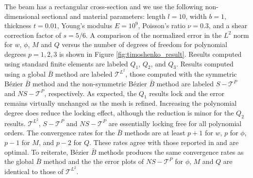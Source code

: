 The beam has a rectangular cross-section and we use the following non-dimensional sectional and material parameters: length $l=10$, width $b=1$, thickness $t=0.01$, Young's modulus $E=10^9$, Poisson's ratio $\nu=0.3$, and a shear correction factor of $s=5/6$. A comparison of the normalized error in the $L^2$ norm for $w$, $\phi$, $M$ and $Q$ versus the number of degrees of freedom for polynomial degrees $p=1,2,3$ is shown in Figure \ref{fig:timoshenko_result}. Results computed using standard finite elements are labeled $Q_1$, $Q_2$, and $Q_3$. Results computed using a global $\bar{B}$ method are labeled $\mathcal{T}^{L^2}$, those computed with the symmetric B\'ezier $\bar{B}$ method and the non-symmetric B\'ezier $\bar{B}$ method are labeled $S-\mathcal{T}^{P}$ and $NS-\mathcal{T}^{P}$, respectively. As expected, the $Q_1$ results lock and the error remains virtually unchanged as the mesh is refined. Increasing the polynomial degree does reduce the locking effect, although the reduction is minor for the $Q_2$ results. $\mathcal{T}^{L^2}$, $S-\mathcal{T}^{P}$ and $NS-\mathcal{T}^P$ are essentially locking free for all polynomial orders. The convergence rates for the $\bar{B}$ methods are at least $p+1$ for $w$, $p$ for $\phi$, $p-1$ for $M$, and $p-2$ for $Q$. These rates agree with those reported in \cite{kiendl_single-variable_2015} and are optimal. To reiterate, B\'{e}zier $\bar{B}$ methods produces the same convergence rates as the global $\bar{B}$ method {and the the error plots of $NS-\mathcal{T}^{P}$ for $\phi$, $M$ and $Q$ are identical to those of $\mathcal{T}^{L^2}$}.

